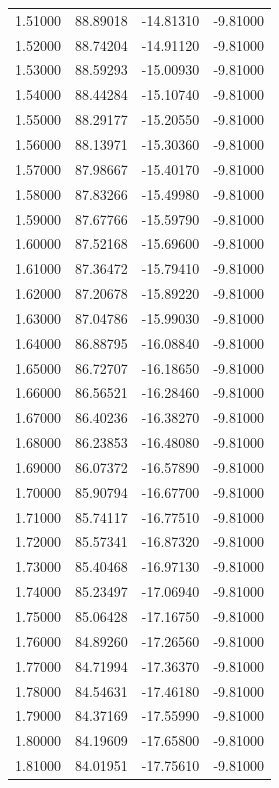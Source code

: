 \begin{table}
\begin{tabular}{llll}
1.51000 & 88.89018 & -14.81310 & -9.81000 \\
1.52000 & 88.74204 & -14.91120 & -9.81000 \\
1.53000 & 88.59293 & -15.00930 & -9.81000 \\
1.54000 & 88.44284 & -15.10740 & -9.81000 \\
1.55000 & 88.29177 & -15.20550 & -9.81000 \\
1.56000 & 88.13971 & -15.30360 & -9.81000 \\
1.57000 & 87.98667 & -15.40170 & -9.81000 \\
1.58000 & 87.83266 & -15.49980 & -9.81000 \\
1.59000 & 87.67766 & -15.59790 & -9.81000 \\
1.60000 & 87.52168 & -15.69600 & -9.81000 \\
1.61000 & 87.36472 & -15.79410 & -9.81000 \\
1.62000 & 87.20678 & -15.89220 & -9.81000 \\
1.63000 & 87.04786 & -15.99030 & -9.81000 \\
1.64000 & 86.88795 & -16.08840 & -9.81000 \\
1.65000 & 86.72707 & -16.18650 & -9.81000 \\
1.66000 & 86.56521 & -16.28460 & -9.81000 \\
1.67000 & 86.40236 & -16.38270 & -9.81000 \\
1.68000 & 86.23853 & -16.48080 & -9.81000 \\
1.69000 & 86.07372 & -16.57890 & -9.81000 \\
1.70000 & 85.90794 & -16.67700 & -9.81000 \\
1.71000 & 85.74117 & -16.77510 & -9.81000 \\
1.72000 & 85.57341 & -16.87320 & -9.81000 \\
1.73000 & 85.40468 & -16.97130 & -9.81000 \\
1.74000 & 85.23497 & -17.06940 & -9.81000 \\
1.75000 & 85.06428 & -17.16750 & -9.81000 \\
1.76000 & 84.89260 & -17.26560 & -9.81000 \\
1.77000 & 84.71994 & -17.36370 & -9.81000 \\
1.78000 & 84.54631 & -17.46180 & -9.81000 \\
1.79000 & 84.37169 & -17.55990 & -9.81000 \\
1.80000 & 84.19609 & -17.65800 & -9.81000 \\
1.81000 & 84.01951 & -17.75610 & -9.81000 \\

\end{tabular}
\end{table}
